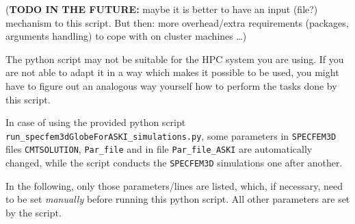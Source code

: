 \documentclass[12pt,a4paper]{article}
\newcommand{\lcode}[1]{\nolinkurl{#1}}
\begin{document}
({\bf TODO IN THE FUTURE:} maybe it is better to have an input (file?) mechanism to this script. But then: more
overhead/extra requirements (packages, arguments handling) to cope with on cluster machines \dots)

The python script may not be suitable for the HPC system you are using. If you are not able to adapt 
it in a way which makes it possible to be used, you might have to figure out an analogous way yourself 
how to perform the tasks done by this script.

In case of using the provided python script \lcode{run_specfem3dGlobeForASKI_simulations.py},
some parameters in \lcode{SPECFEM3D} files \lcode{CMTSOLUTION}, \lcode{Par_file} 
and in file \lcode{Par_file_ASKI} are automatically changed, while the script conducts the
\lcode{SPECFEM3D} simulations one after another.

In the following, only those parameters/lines are listed, which, if necessary, need to be set 
\emph{manually} before running this python script. All other parameters are set by the script.

\end{document}
